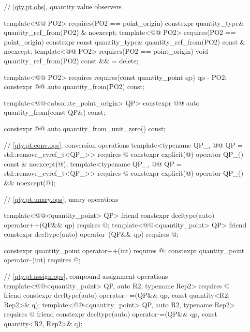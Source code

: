 \begin{codeblock}
{{  // \ref{qty.pt.obs}, quantity value observers

  template<@@ PO2>
    requires(PO2{} == point_origin)
  constexpr quantity_type& quantity_ref_from(PO2) & noexcept;
  template<@@ PO2>
    requires(PO2{} == point_origin)
  constexpr const quantity_type& quantity_ref_from(PO2) const & noexcept;
  template<@@ PO2>
    requires(PO2{} == point_origin)
  void quantity_ref_from(PO2) const && = delete;

  template<@@ PO2>
    requires requires(const quantity_point qp) { qp - PO2{}; }
  constexpr @@ auto quantity_from(PO2) const;

  template<@@<absolute_point_origin> QP>
  constexpr @@ auto quantity_from(const QP&) const;

  constexpr @@ auto quantity_from_unit_zero() const;

  // \ref{qty.pt.conv.ops}, conversion operations
  template<typename QP_, @@ QP = std::remove_cvref_t<QP_>>
    requires @\seebelownc@
  constexpr explicit(@\seebelownc@) operator QP_() const & noexcept(@\seebelownc@);
  template<typename QP_, @@ QP = std::remove_cvref_t<QP_>>
    requires @\seebelownc@
  constexpr explicit(@\seebelownc@) operator QP_() && noexcept(@\seebelownc@);

  // \ref{qty.pt.unary.ops}, unary operations

  template<@@<quantity_point> QP>
  friend constexpr decltype(auto) operator++(QP&& qp)
    requires @\seebelownc@;
  template<@@<quantity_point> QP>
  friend constexpr decltype(auto) operator--(QP&& qp)
    requires @\seebelownc@;

  constexpr quantity_point operator++(int)
    requires @\seebelownc@;
  constexpr quantity_point operator--(int)
    requires @\seebelownc@;

  // \ref{qty.pt.assign.ops}, compound assignment operations
  template<@@<quantity_point> QP, auto R2, typename Rep2>
    requires @\seebelownc@
  friend constexpr decltype(auto) operator+=(QP&& qp, const quantity<R2, Rep2>& q);
  template<@@<quantity_point> QP, auto R2, typename Rep2>
    requires @\seebelownc@
  friend constexpr decltype(auto) operator-=(QP&& qp, const quantity<R2, Rep2>& q);

}}
\end{codeblock}
